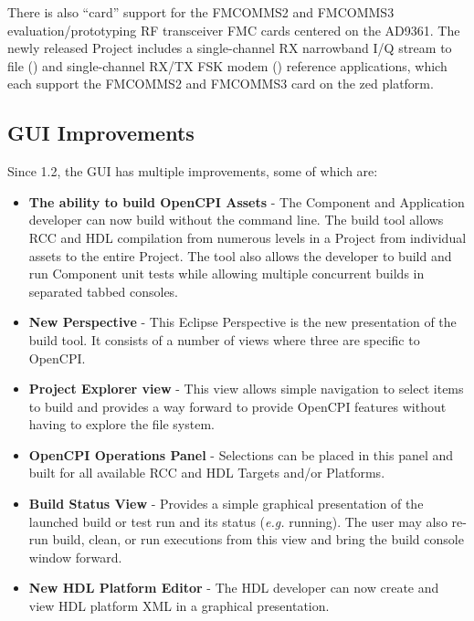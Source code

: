 There is also ``card'' support for the FMCOMMS2 and FMCOMMS3 evaluation/prototyping RF transceiver FMC cards centered on the AD9361. The newly released  Project includes a single-channel RX narrowband I/Q stream to file () and single-channel RX/TX FSK modem () reference applications, which each support the FMCOMMS2 and FMCOMMS3 card on the zed platform.

\subsection{GUI Improvements}
Since 1.2, the GUI has multiple improvements, some of which are:

\begin{itemize}
\item \textbf{The ability to build OpenCPI Assets} - The Component and Application developer can now build without the command line. The build tool allows RCC and HDL compilation from numerous levels in a Project from individual assets to the entire Project. The tool also allows the developer to build and run Component unit tests while allowing multiple concurrent builds in separated tabbed consoles.

\item \textbf{New Perspective} - This Eclipse Perspective is the new presentation of the build tool. It consists of a number of views where three are specific to OpenCPI.

\item \textbf{Project Explorer view} - This view allows simple navigation to select items to build and provides a way forward to provide OpenCPI features without having to explore the file system.

\item \textbf{OpenCPI Operations Panel} - Selections can be placed in this panel and built for all available RCC and HDL Targets and/or Platforms.

\item \textbf{Build Status View} - Provides a simple graphical presentation of the launched build or test run and its status (\textit{e.g.} running). The user may also re-run build, clean, or run executions from this view and bring the build console window forward.

\item \textbf{New HDL Platform Editor} - The HDL developer can now create and view HDL platform XML in a graphical presentation.
\end{itemize}

